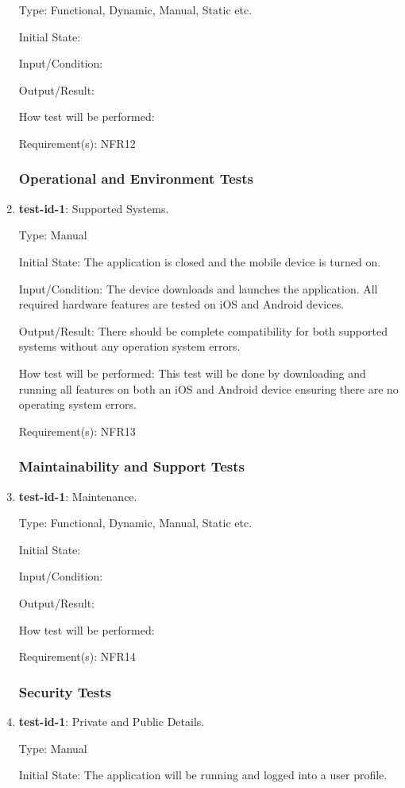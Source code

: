 \documentclass[12pt, titlepage]{article}
\begin{document}
\begin{enumerate}
		Type: Functional, Dynamic, Manual, Static etc.
		
		Initial State: 
		
		Input/Condition: 
		
		Output/Result: 
		
		How test will be performed: 
		
		Requirement(s): NFR12
	\subsubsection{Operational and Environment Tests}
		\item{\textbf{test-id-1}}: Supported Systems.
		
		Type: Manual
		
		Initial State: The application is closed and the mobile device is turned on.
		
		Input/Condition: The device downloads and launches the application. All required hardware features are tested on iOS and Android devices.
		
		Output/Result: There should be complete compatibility for both supported systems without any operation system errors. 
		
		How test will be performed: This test will be done by downloading and running all features on both an iOS and Android device ensuring there are no operating system errors.
		
		Requirement(s): NFR13
	\subsubsection{Maintainability and Support Tests}
		\item{\textbf{test-id-1}}: Maintenance.
		
		Type: Functional, Dynamic, Manual, Static etc.
		
		Initial State: 
		
		Input/Condition: 
		
		Output/Result: 
		
		How test will be performed: 
		
		Requirement(s): NFR14
	\subsubsection{Security Tests}
		\item{\textbf{test-id-1}}: Private and Public Details.
		
		Type: Manual
		
		Initial State: The application will be running and logged into a user profile. 
		

\end{enumerate}
\end{document}
